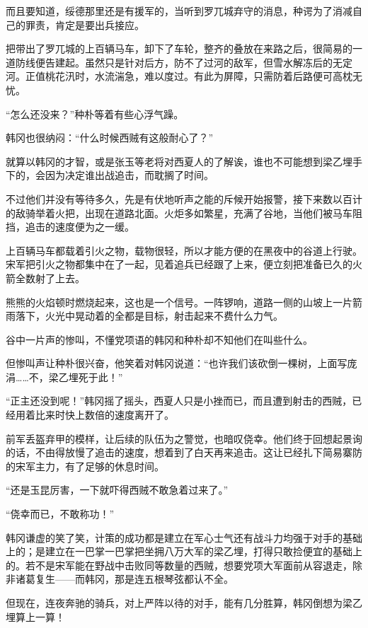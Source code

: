 而且要知道，绥德那里还是有援军的，当听到罗兀城弃守的消息，种谔为了消减自己的罪责，肯定是要出兵接应。

把带出了罗兀城的上百辆马车，卸下了车轮，整齐的叠放在来路之后，很简易的一道防线便告建起。虽然只是针对后方，防不了过河的敌军，但雪水解冻后的无定河。正值桃花汛时，水流湍急，难以度过。有此为屏障，只需防着后路便可高枕无忧。

“怎么还没来？”种朴等着有些心浮气躁。

韩冈也很纳闷：“什么时候西贼有这般耐心了？”

就算以韩冈的才智，或是张玉等老将对西夏人的了解诶，谁也不可能想到梁乙埋手下的，会因为决定谁出战追击，而耽搁了时间。

不过他们并没有等待多久，先是有伏地听声之能的斥候开始报警，接下来数以百计的敌骑举着火把，出现在道路北面。火炬多如繁星，充满了谷地，当他们被马车阻挡，追击的速度便为之一缓。

上百辆马车都载着引火之物，载物很轻，所以才能方便的在黑夜中的谷道上行驶。宋军把引火之物都集中在了一起，见着追兵已经跟了上来，便立刻把准备已久的火箭全数射了上去。

熊熊的火焰顿时燃烧起来，这也是一个信号。一阵锣响，道路一侧的山坡上一片箭雨落下，火光中晃动着的全都是目标，射击起来不费什么力气。

谷中一片声的惨叫，不懂党项语的韩冈和种朴却不知他们在叫些什么。

但惨叫声让种朴很兴奋，他笑着对韩冈说道：“也许我们该砍倒一棵树，上面写庞涓……不，梁乙埋死于此！”

“正主还没到呢！”韩冈摇了摇头，西夏人只是小挫而已，而且遭到射击的西贼，已经用着比来时快上数倍的速度离开了。

前军丢盔弃甲的模样，让后续的队伍为之警觉，也暗叹侥幸。他们终于回想起景询的话，不由得放慢了追击的速度，想着到了白天再来追击。这让已经扎下简易寨防的宋军主力，有了足够的休息时间。

“还是玉昆厉害，一下就吓得西贼不敢急着过来了。”

“侥幸而已，不敢称功！”

韩冈谦虚的笑了笑，计策的成功都是建立在军心士气还有战斗力均强于对手的基础上的；是建立在一巴掌一巴掌把坐拥八万大军的梁乙埋，打得只敢捡便宜的基础上的。若不是宋军能在野战中击败同等数量的西贼，想要党项大军面前从容退走，除非诸葛复生——而韩冈，那是连五根琴弦都认不全。

但现在，连夜奔驰的骑兵，对上严阵以待的对手，能有几分胜算，韩冈倒想为梁乙埋算上一算！

